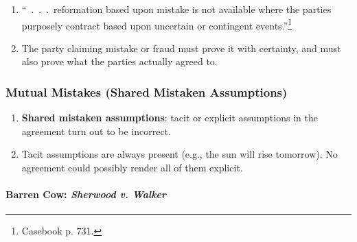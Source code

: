 \begin{enumerate}
    \item ``~.~.~.~reformation based upon mistake is not available where the 
    parties purposely contract based upon uncertain or contingent 
    events.''\footnote{Casebook p. 731.}
    \item The party claiming mistake or fraud must prove it with certainty, 
    and must also prove what the parties actually agreed to.
\end{enumerate}

\subsubsection{Mutual Mistakes (Shared Mistaken Assumptions)}

\begin{enumerate}
    \item \textbf{Shared mistaken assumptions}: tacit or explicit assumptions 
    in the agreement turn out to be incorrect.
    \item Tacit assumptions are always present (e.g., the sun will rise 
    tomorrow). No agreement could possibly render all of them explicit.
\end{enumerate}

\paragraph{Barren Cow: \emph{Sherwood v. Walker}}

